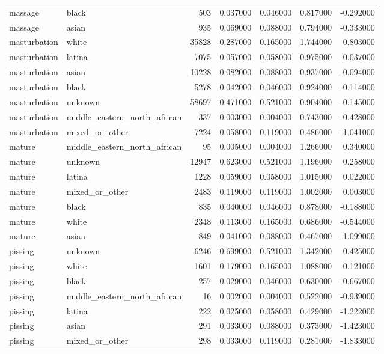 \begin{tabular}{llrrrrr}
massage & black & 503 & 0.037000 & 0.046000 & 0.817000 & -0.292000 \\
massage & asian & 935 & 0.069000 & 0.088000 & 0.794000 & -0.333000 \\
masturbation & white & 35828 & 0.287000 & 0.165000 & 1.744000 & 0.803000 \\
masturbation & latina & 7075 & 0.057000 & 0.058000 & 0.975000 & -0.037000 \\
masturbation & asian & 10228 & 0.082000 & 0.088000 & 0.937000 & -0.094000 \\
masturbation & black & 5278 & 0.042000 & 0.046000 & 0.924000 & -0.114000 \\
masturbation & unknown & 58697 & 0.471000 & 0.521000 & 0.904000 & -0.145000 \\
masturbation & middle_eastern_north_african & 337 & 0.003000 & 0.004000 & 0.743000 & -0.428000 \\
masturbation & mixed_or_other & 7224 & 0.058000 & 0.119000 & 0.486000 & -1.041000 \\
mature & middle_eastern_north_african & 95 & 0.005000 & 0.004000 & 1.266000 & 0.340000 \\
mature & unknown & 12947 & 0.623000 & 0.521000 & 1.196000 & 0.258000 \\
mature & latina & 1228 & 0.059000 & 0.058000 & 1.015000 & 0.022000 \\
mature & mixed_or_other & 2483 & 0.119000 & 0.119000 & 1.002000 & 0.003000 \\
mature & black & 835 & 0.040000 & 0.046000 & 0.878000 & -0.188000 \\
mature & white & 2348 & 0.113000 & 0.165000 & 0.686000 & -0.544000 \\
mature & asian & 849 & 0.041000 & 0.088000 & 0.467000 & -1.099000 \\
pissing & unknown & 6246 & 0.699000 & 0.521000 & 1.342000 & 0.425000 \\
pissing & white & 1601 & 0.179000 & 0.165000 & 1.088000 & 0.121000 \\
pissing & black & 257 & 0.029000 & 0.046000 & 0.630000 & -0.667000 \\
pissing & middle_eastern_north_african & 16 & 0.002000 & 0.004000 & 0.522000 & -0.939000 \\
pissing & latina & 222 & 0.025000 & 0.058000 & 0.429000 & -1.222000 \\
pissing & asian & 291 & 0.033000 & 0.088000 & 0.373000 & -1.423000 \\
pissing & mixed_or_other & 298 & 0.033000 & 0.119000 & 0.281000 & -1.833000 \\

\end{tabular}
